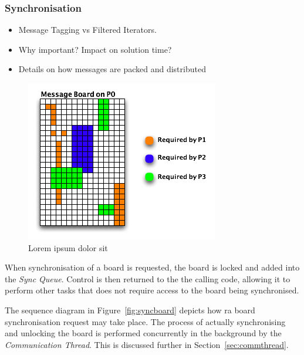 \subsubsection{Synchronisation}
\label{sec:mb_sync}

\begin{itemize}
\item Message Tagging vs Filtered Iterators.
\item Why important? Impact on solution time?
\item Details on how messages are packed and distributed
\end{itemize} 

\begin{figure}[h]
 \centering
  \includegraphics[scale=0.70]{taggedboard.png}
 \caption{Lorem ipsum dolor sit}
 \label{fig:taggedboard}
\end{figure}

When synchronisation of a board is requested, the board is locked and added into the \textit{Sync Queue}. Control is then returned to the the calling code, allowing it to perform other tasks that does not require access to the board being synchronised. 

The sequence diagram in  Figure~\ref{fig:syncboard} depicts how ra board synchronisation request may take place. The process of actually synchronising and unlocking the board is performed concurrently in the background by the \textit{Communication Thread}. This is discussed further in Section~\ref{sec:commthread}.

